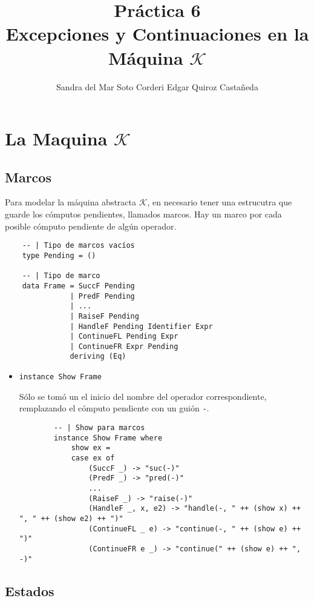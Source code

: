 \documentclass{article}
\title {
    Práctica 6\\
    Excepciones y Continuaciones en la Máquina $\mathcal{K}$
}
\author {
    Sandra del Mar Soto Corderi \quad Edgar Quiroz Castañeda
}
\newcommand{\tx}[1]{\texttt{#1}}
\begin{document}
    \maketitle

    \section{La Maquina $\mathcal{K}$}

    \subsection{Marcos}

    Para modelar la máquina abstracta $\mathcal{K}$, en necesario tener una 
    estrucutra que guarde los cómputos pendientes, llamados marcos. Hay un marco
    por cada posible cómputo pendiente de algún operador.

    \begin{verbatim}
    -- | Tipo de marcos vacíos
    type Pending = ()

    -- | Tipo de marco
    data Frame = SuccF Pending
               | PredF Pending
               | ...
               | RaiseF Pending
               | HandleF Pending Identifier Expr
               | ContinueFL Pending Expr
               | ContinueFR Expr Pending
               deriving (Eq)
    \end{verbatim}

    \begin{itemize}
        \item \tx{instance Show Frame}

        Sólo se tomó un el inicio del nombre del operador correspondiente, 
        remplazando el cómputo pendiente con un guión \tx{-}.

        \begin{verbatim}
        -- | Show para marcos
        instance Show Frame where
            show ex =
            case ex of
                (SuccF _) -> "suc(-)"
                (PredF _) -> "pred(-)"
                ...
                (RaiseF _) -> "raise(-)"
                (HandleF _, x, e2) -> "handle(-, " ++ (show x) ++ ", " ++ (show e2) ++ ")"
                (ContinueFL _ e) -> "continue(-, " ++ (show e) ++ ")"
                (ContinueFR e _) -> "continue(" ++ (show e) ++ ", -)"
        \end{verbatim}
    \end{itemize}

    \subsection{Estados}
\end{document}
